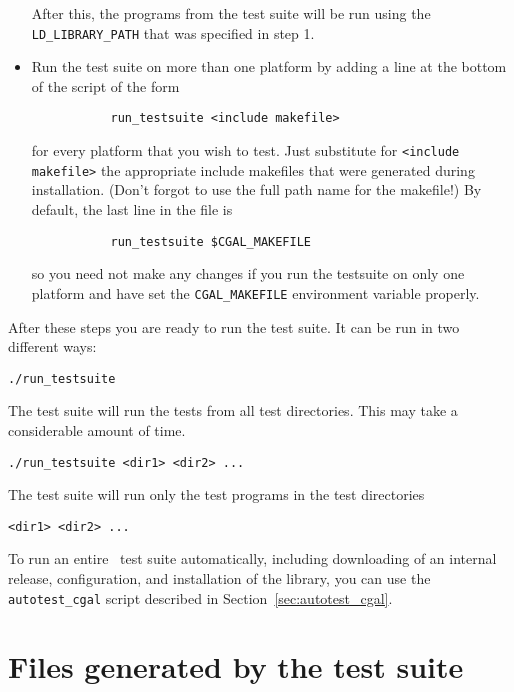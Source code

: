 \begin{itemize}
      After this, the programs from the test suite will be run using the
      {\tt LD\_LIBRARY\_PATH} that was specified in step 1. 

\item Run the test suite on more than one platform by adding a line at the 
      bottom of the script of the form
      \begin{verbatim}
           run_testsuite <include makefile>
      \end{verbatim}
      for every platform that you wish to test. Just substitute for
      \verb|<include makefile>| the appropriate include makefiles that
      were generated during installation. (Don't forgot to use the
      full path name for the makefile!)  By default, the last line in the
      file is
      \begin{verbatim}
           run_testsuite $CGAL_MAKEFILE
      \end{verbatim}
      so you need not make any changes if you run the testsuite on only one
      platform and have set the {\tt CGAL\_MAKEFILE} environment variable
      properly.%
\end{itemize}

After these steps you are ready to run the test suite. It can be run in two
different ways:
\begin{verbatim}
./run_testsuite
\end{verbatim}

The test suite will run the tests from all test directories. This may take a
considerable amount of time.

\begin{verbatim}
./run_testsuite <dir1> <dir2> ...
\end{verbatim}

The test suite will run only the test programs in the test directories
\begin{verbatim}<dir1> <dir2> ... \end{verbatim}

To run an entire \cgal\ test suite automatically, including downloading of
an internal release, configuration, and installation of the library, you 
can use the {\tt autotest\_cgal} script described in 
Section~\ref{sec:autotest_cgal}.


\section{Files generated by the test suite}
\label{sec:test_suite_output}


